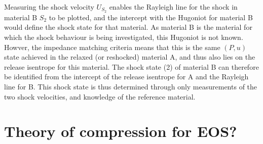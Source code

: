 Measuring the shock velocity $U_{S_2}$ enables the Rayleigh line for the shock in material B $S_2$ to be plotted, and the intercept with the Hugoniot for material B would define the shock state for that material. As material B is the material for which the shock behaviour is being investigated, this Hugoniot is not known. Howver, the impedance matching criteria means that this is the same $(P, u)$ state achieved in the relaxed (or reshocked) material A, and thus also lies on the release isentrope for this material. The shock state (2) of material B can therefore be identified from the intercept of the release isentrope for A and the Rayleigh line for B. This shock state is thus determined through only measurements of the two shock velocities, and knowledge of the reference material.

\section{Theory of compression for EOS?}